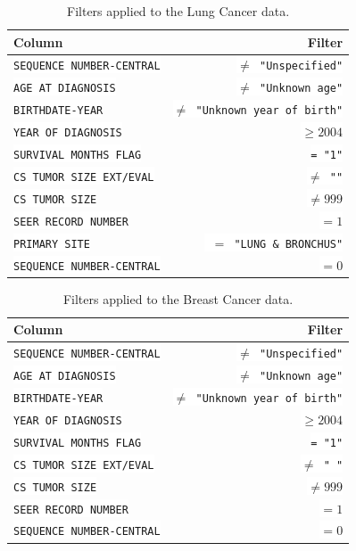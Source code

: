 \documentclass[10pt,letterpaper]{article}
\newcommand{\codewhite}[1]{\colorbox{white}{\texttt{#1}}}
\begin{document}
\begin{table}[!ht]
\begin{adjustwidth}{-2.25in}{0in} %
\caption{\label{tab:lungfilter} Filters applied to the Lung Cancer data.}
\begin{tabular}{lr}
\toprule
 Column &  Filter \\
\midrule
\codewhite{SEQUENCE NUMBER-CENTRAL} & \codewhite{$\neq$ "Unspecified"} \\
\codewhite{AGE AT DIAGNOSIS} & \codewhite{$\neq$ "Unknown age"} \\
\codewhite{BIRTHDATE-YEAR} & \codewhite{$\neq$ "Unknown year of birth"} \\
\codewhite{YEAR OF DIAGNOSIS} & \codewhite{$\geq 2004$} \\
\codewhite{SURVIVAL MONTHS FLAG} & \codewhite{= "1"}\\
\codewhite{CS TUMOR SIZE EXT/EVAL} & \codewhite{$\neq$ ""} \\
\codewhite{CS TUMOR SIZE} & \codewhite{$\neq 999$} \\
\codewhite{SEER RECORD NUMBER} & \codewhite{$= 1$} \\
\codewhite{PRIMARY SITE} & \codewhite{ $=$ "LUNG \& BRONCHUS"} \\
\codewhite{SEQUENCE NUMBER-CENTRAL} & \codewhite{$=0$} \\
\bottomrule
\end{tabular}
\end{adjustwidth}
\end{table}



\begin{table}[!ht]
\begin{adjustwidth}{-2.25in}{0in} %
\caption{\label{tab:breastfilter} Filters applied to the Breast Cancer data.}
\begin{tabular}{lr}
\toprule
 Column &  Filter \\
\midrule
\codewhite{SEQUENCE NUMBER-CENTRAL} & \codewhite{$\neq$ "Unspecified"} \\
\codewhite{AGE AT DIAGNOSIS} & \codewhite{$\neq$ "Unknown age"} \\
\codewhite{BIRTHDATE-YEAR} & \codewhite{$\neq$ "Unknown year of birth"} \\
\codewhite{YEAR OF DIAGNOSIS} & \codewhite{$\geq 2004$} \\
\codewhite{SURVIVAL MONTHS FLAG} & \codewhite{= "1"}\\
\codewhite{CS TUMOR SIZE EXT/EVAL} & \codewhite{$\neq$ " "} \\
\codewhite{CS TUMOR SIZE} & \codewhite{$\neq 999$} \\
\codewhite{SEER RECORD NUMBER} & \codewhite{$= 1$} \\
\codewhite{SEQUENCE NUMBER-CENTRAL} & \codewhite{$=0$} \\
\bottomrule
\end{tabular}
\end{adjustwidth}
\end{table}
\end{document}
